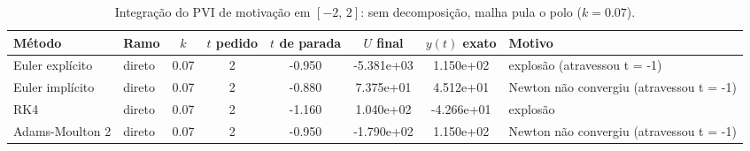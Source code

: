 \begin{table}[H]
    \centering
    \small
    \begin{tabular}{llcccccl}
        \hline
        Método & Ramo & $k$ & $t$ pedido & $t$ de parada & $U$ final & $y(t)$ exato & Motivo \\
        \hline
        Euler explícito & direto & 0.07 & 2 & -0.950 & -5.381e+03 & 1.150e+02 & explosão (atravessou t = -1) \\
        Euler implícito & direto & 0.07 & 2 & -0.880 & 7.375e+01 & 4.512e+01 & Newton não convergiu (atravessou t = -1) \\
        RK4 & direto & 0.07 & 2 & -1.160 & 1.040e+02 & -4.266e+01 & explosão \\
        Adams-Moulton 2 & direto & 0.07 & 2 & -0.950 & -1.790e+02 & 1.150e+02 & Newton não convergiu (atravessou t = -1) \\
        \hline
    \end{tabular}
    \caption{Integração do PVI de motivação em $[-2,\, 2]$: sem decomposição, malha pula o polo ($k = 0.07$).}
    \label{tab:m2_2_sd_pula_polo}
\end{table}
